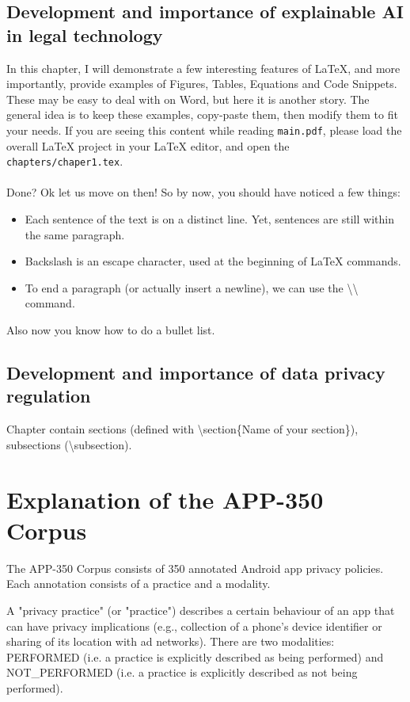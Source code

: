 \subsection{Development and importance of explainable AI in legal technology}
In this chapter, I will demonstrate a few interesting features of LaTeX, and more importantly, provide examples of Figures, Tables, Equations and Code Snippets.
These may be easy to deal with on Word, but here it is another story.
The general idea is to keep these examples, copy-paste them, then modify them to fit your needs.
If you are seeing this content while reading \texttt{main.pdf}, please load the overall LaTeX project in your LaTeX editor, and open the \texttt{chapters/chaper1.tex}.
\\
\\
Done?
Ok let us move on then!
So by now, you should have noticed a few things:
\begin{itemize}
  \item Each sentence of the text is on a distinct line. Yet, sentences are still within the same paragraph.
  \item Backslash is an escape character, used at the beginning of LaTeX commands.
  \item To end a paragraph (or actually insert a newline), we can use the \textbackslash{}\textbackslash{} command.
\end{itemize}
Also now you know how to do a bullet list.

\subsection{Development and importance of data privacy regulation}
Chapter contain sections (defined with \textbackslash{}section\{Name of your section\}), subsections (\textbackslash{}subsection).

\section{Explanation of the APP-350 Corpus}
The APP-350 Corpus consists of 350 annotated Android app privacy policies. Each annotation consists of a practice and a modality.

A "privacy practice" (or "practice") describes a certain behaviour of an app that can have privacy implications (e.g., collection of a phone's device identifier or sharing of its location with ad networks). There are two modalities: PERFORMED (i.e. a practice is explicitly described as being performed) and NOT\_PERFORMED (i.e. a practice is explicitly described as not being performed).

